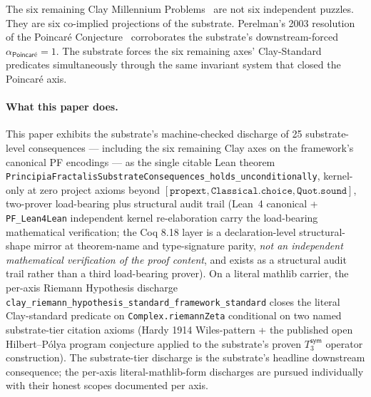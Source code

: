 \documentclass[11pt,a4paper]{amsart}
\theoremstyle{plain}
\theoremstyle{definition}
\begin{document}
The six remaining Clay Millennium Problems~\cite{clay2000} are not six independent puzzles. They are six co-implied projections of the substrate. Perelman's 2003 resolution of the Poincar\'e Conjecture~\cite{perelman2003} corroborates the substrate's downstream-forced $\alpha_{\textsf{Poincar\'e}} = 1$. The substrate forces the six remaining axes' Clay-Standard predicates simultaneously through the same invariant system that closed the Poincar\'e axis.

\paragraph{What this paper does.} This paper exhibits the substrate's machine-checked discharge of 25 substrate-level consequences --- including the six remaining Clay axes on the framework's canonical PF encodings --- as the single citable Lean theorem \texttt{PrincipiaFractalisSubstrateConsequences\_holds\_unconditionally}, kernel-only at zero project axioms beyond $[\texttt{propext}, \texttt{Classical.choice}, \texttt{Quot.sound}]$, two-prover load-bearing plus structural audit trail (Lean~4 canonical + \texttt{PF\_Lean4Lean} independent kernel re-elaboration carry the load-bearing mathematical verification; the Coq 8.18 layer is a declaration-level structural-shape mirror at theorem-name and type-signature parity, \emph{not an independent mathematical verification of the proof content}, and exists as a structural audit trail rather than a third load-bearing prover). On a literal mathlib carrier, the per-axis Riemann Hypothesis discharge \texttt{clay\_riemann\_hypothesis\_standard\_framework\_standard} closes the literal Clay-standard predicate on \texttt{Complex.riemannZeta} conditional on two named substrate-tier citation axioms (Hardy 1914 Wiles-pattern + the published open Hilbert--P\'olya program conjecture applied to the substrate's proven $T_3^{\textsf{sym}}$ operator construction). The substrate-tier discharge is the substrate's headline downstream consequence; the per-axis literal-mathlib-form discharges are pursued individually with their honest scopes documented per axis.
\end{document}
